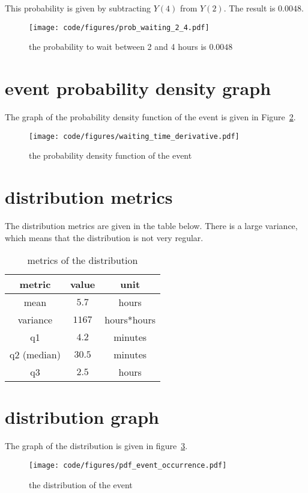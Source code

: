 This probability is given by subtracting $Y(4)$ from $Y(2)$. The result is $0.0048$.

\begin{figure}[h]
\centering
\texttt{[image: code/figures/prob\_waiting\_2\_4.pdf]}
\caption{the probability to wait between 2 and 4 hours is $0.0048$ \label{fig:waiting}}
\end{figure}
\FloatBarrier

\section{event probability density graph}

The graph of the probability density function of the event is given in Figure~\ref{fig:waiting}.
\begin{figure}[h]
\centering
\texttt{[image: code/figures/waiting\_time\_derivative.pdf]}
\caption{the probability density function of the event \label{fig:waiting}}
\end{figure}
\FloatBarrier

\section{distribution metrics}

The distribution metrics are given in the table below. There is a large variance, which means that the distribution is not very regular.
\begin{table}[h]
\centering
\begin{tabular}{c|c|c}
    \hline
    metric & value & unit\\
    \hline
    mean & $5.7$ & hours \\
    variance & $1167$ & hours*hours \\
    q1 & $4.2$ & minutes \\
    q2 (median) & $30.5$ & minutes \\
    q3 & $2.5$ & hours \\
    \hline
\end{tabular}
\caption{metrics of the distribution \label{tab:metrics}}
\end{table}
\FloatBarrier

\section{distribution graph}
The graph of the distribution is given in figure~\ref{fig:distribution}.
\begin{figure}[h]
\centering
\texttt{[image: code/figures/pdf\_event\_occurrence.pdf]}
\caption{the distribution of the event \label{fig:distribution}}
\end{figure}
\FloatBarrier

